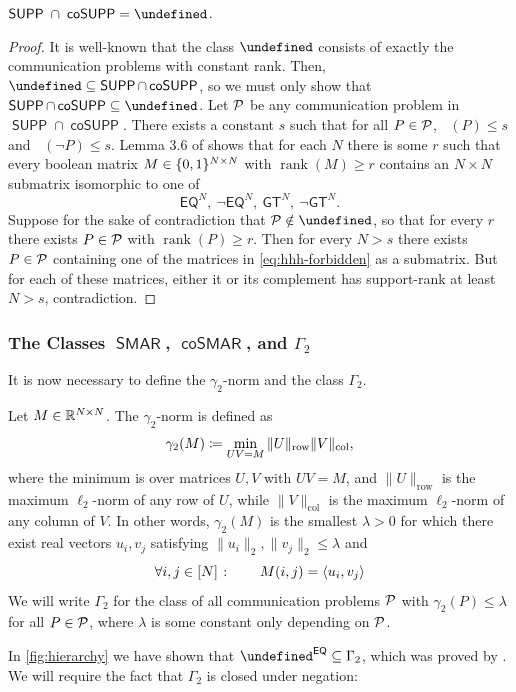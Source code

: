 \documentclass{article}
\DeclareMathOperator{\suprank}{rank_0}
\DeclareMathOperator{\rank}{rank}
\newcommand{\cplxclass}[1]{\mathsf{#1}}
\let\P\undefined\DeclareMathOperator{\P}{\cplxclass{P}}
\DeclareMathOperator{\SUPP}{\cplxclass{SUPP}}
\DeclareMathOperator{\coSUPP}{\cplxclass{coSUPP}}
\DeclareMathOperator{\SMAR}{\cplxclass{SMAR}}
\DeclareMathOperator{\coSMAR}{\cplxclass{coSMAR}}
\newcommand{\EQ}{\mathsf{EQ}}
\newcommand{\GEQ}{\mathsf{GT}}
\begin{document}
\begin{boxproposition}\label{prop:supp-cap-cosupp}
$\SUPP\ \cap\ \coSUPP = \P$.
\end{boxproposition}
\begin{proof}
It is well-known that the class $\P$ consists of exactly the communication
problems with constant rank. Then, $\P \subseteq \SUPP \cap \coSUPP$, so we must
only show that $\SUPP \cap \coSUPP \subseteq \P$. Let $\mathcal{P}$ be any communication
problem in $\SUPP \cap \coSUPP$. There exists a constant $s$ such that
for all $P \in \mathcal{P}$, $\suprank(P) \leq s$ and $\suprank(\neg P) \leq s$. Lemma 3.6 of \cite{HHH23} shows that for each $N$ there is some $r$ such that
every boolean matrix $M \in \{0,1\}^{N \times N}$ with $\rank(M) \geq r$ contains an
$N \times N$ submatrix isomorphic to one of
\begin{equation}
\label{eq:hhh-forbidden}
    \EQ^N,\ \neg \EQ^N,\ \GEQ^N,\ \neg \GEQ^N .
\end{equation}
Suppose for the sake of contradiction that $\cP \notin \P$, so that for every
$r$ there exists $P \in \mathcal{P}$ with $\rank(P) \geq r$. Then for every $N > s$
there exists $P \in \mathcal{P}$ containing one of the matrices in
\cref{eq:hhh-forbidden} as a submatrix. But for each of these matrices, either it or its
complement has support-rank at least $N > s$, contradiction.
\end{proof}

\subsubsection{The Classes $\SMAR$, $\coSMAR$, and $\Gamma_2$}

It is now necessary to define the $\gamma_2$-norm and the class $\Gamma_2$.
\begin{definition}
\label{def:gamma-2}
Let $M \in \mathbb{R}^{N \times N}$. The $\gamma_2$-norm is defined as
\[
    \gamma_2(M) \coloneqq \min_{UV = M} \|U\|_\text{row} \|V\|_\text{col} ,
\]
where the minimum is over matrices $U,V$ with $UV = M$, and $\|U\|_\text{row}$
is the maximum $\ell_2$-norm of any row of $U$, while $\|V\|_\text{col}$
is the maximum $\ell_2$-norm of any column of $V$. In other words, $\gamma_2(M)$ is the smallest
$\lambda > 0$ for which there exist real vectors $u_i, v_j$ satisfying $\|u_i\|_2, \|v_j\|_2 \leq \lambda$ and
\[
    \forall i,j \in [N] \;\colon\qquad M(i,j) = \langle u_i, v_j \rangle
\]
We will write $\Gamma_2$ for the class
of all communication problems $\mathcal{P}$ with $\gamma_2(P) \leq \lambda$ for all
$P \in \mathcal{P}$, where $\lambda$ is some constant only depending on $\mathcal{P}$.
\end{definition}
In \cref{fig:hierarchy} we have shown that $\P^\EQ \subseteq \Gamma_2$, which was
proved by \cite{HHH22}. We will require the fact that $\Gamma_2$ is closed under negation:
\end{document}
